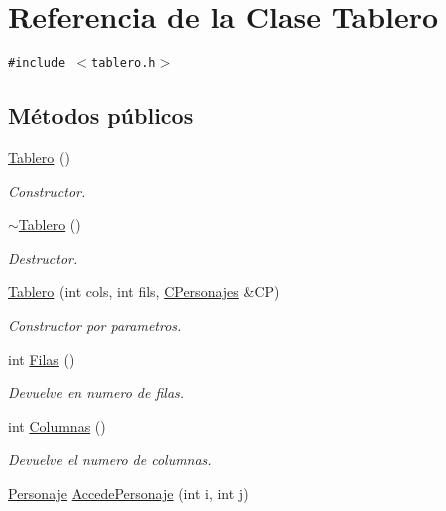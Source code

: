 \hypertarget{class_tablero}{
\section{Referencia de la Clase Tablero}
\label{class_tablero}
}
{\tt \#include $<$tablero.h$>$}

\subsection*{Métodos públicos}
\begin{CompactItemize}
\item 
\hyperlink{class_tablero_b4912f28f1db392e1dd44ddc98bd4f59}{Tablero} ()
\begin{CompactList}\small\item\em Constructor. \item\end{CompactList}\item 
\hyperlink{class_tablero_7d4a64967ce0bbe2cce49ec846834c84}{$\sim$Tablero} ()
\begin{CompactList}\small\item\em Destructor. \item\end{CompactList}\item 
\hyperlink{class_tablero_034b3882eed22ce2d2da3787f86291af}{Tablero} (int cols, int fils, \hyperlink{class_c_personajes}{CPersonajes} \&CP)
\begin{CompactList}\small\item\em Constructor por parametros. \item\end{CompactList}\item 
int \hyperlink{class_tablero_b1fc381f5d873e528c1c63f97e6e3ba9}{Filas} ()
\begin{CompactList}\small\item\em Devuelve en numero de filas. \item\end{CompactList}\item 
int \hyperlink{class_tablero_54df6b87ccaebbd19ce4447e25465076}{Columnas} ()
\begin{CompactList}\small\item\em Devuelve el numero de columnas. \item\end{CompactList}\item 
\hyperlink{class_personaje}{Personaje} \hyperlink{class_tablero_ac371cb24f7f9622eeadaa89769ec727}{AccedePersonaje} (int i, int j)

\end{CompactItemize}
